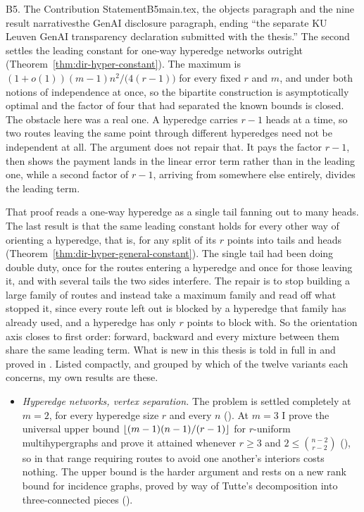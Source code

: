 \begin{offcutrewrite}{B5. The Contribution Statement}{B5}{main.tex, the objects paragraph and the nine result narratives}{the GenAI disclosure paragraph, ending ``the separate KU Leuven GenAI transparency declaration submitted with the thesis.''}
The second settles the leading constant for one-way hyperedge networks outright (Theorem~\ref{thm:dir-hyper-constant}). The maximum is $(1+o(1))(m-1)n^2/\bigl(4(r-1)\bigr)$ for every fixed $r$ and $m$, and under both notions of independence at once, so the bipartite construction is asymptotically optimal and the factor of four that had separated the known bounds is closed. The obstacle here was a real one. A hyperedge carries $r-1$ heads at a time, so two routes leaving the same point through different hyperedges need not be independent at all. The argument does not repair that. It pays the factor $r-1$, then shows the payment lands in the linear error term rather than in the leading one, while a second factor of $r-1$, arriving from somewhere else entirely, divides the leading term.

That proof reads a one-way hyperedge as a single tail fanning out to many heads. The last result is that the same leading constant holds for every other way of orienting a hyperedge, that is, for any split of its $r$ points into tails and heads (Theorem~\ref{thm:dir-hyper-general-constant}). The single tail had been doing double duty, once for the routes entering a hyperedge and once for those leaving it, and with several tails the two sides interfere. The repair is to stop building a large family of routes and instead take a maximum family and read off what stopped it, since every route left out is blocked by a hyperedge that family has already used, and a hyperedge has only $r$ points to block with. So the orientation axis closes to first order: forward, backward and every mixture between them share the same leading term.
\nowreads
What is new in this thesis is told in full in  and proved in . Listed compactly, and grouped by which of the twelve variants each concerns, my own results are these.

\begin{itemize}
  \item \emph{Hyperedge networks, vertex separation.} The problem is settled completely at $m = 2$, for every hyperedge size $r$ and every $n$ (). At $m = 3$ I prove the universal upper bound $\left\lfloor (m-1)(n-1)/(r-1) \right\rfloor$ for $r$-uniform multihypergraphs and prove it attained whenever $r \ge 3$ and $2 \le \binom{n-2}{r-2}$ (), so in that range requiring routes to avoid one another's interiors costs nothing. The upper bound is the harder argument and rests on a new rank bound for incidence graphs, proved by way of Tutte's decomposition into three-connected pieces ().


\end{itemize}
\end{offcutrewrite}
